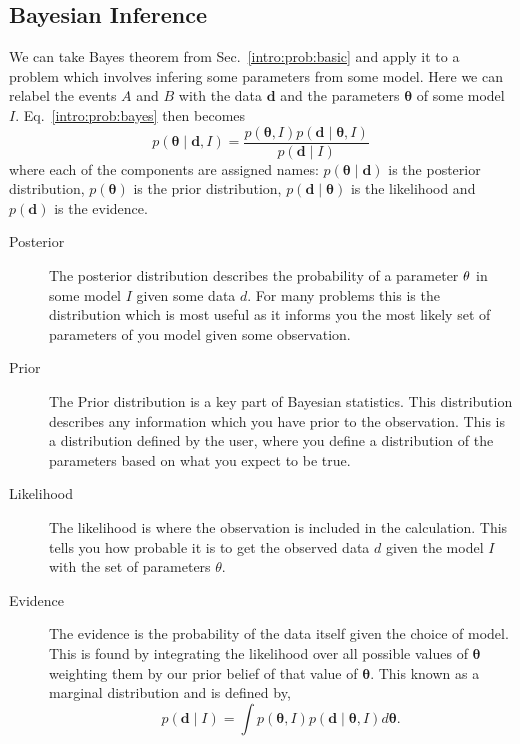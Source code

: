 \subsection{\label{intro:prob:bayes}Bayesian Inference}

We can take Bayes theorem from Sec.~\ref{intro:prob:basic} and apply it to a problem which involves infering some parameters from some model. Here we can relabel the events $A$ and $B$ with the data ${\bm d}$ and the parameters ${\bm \theta}$ of some model $I$.
Eq.~\ref{intro:prob:bayes} then becomes
\begin{equation}
\label{intro:bayes:bayes}
p({\bm \theta} \mid {\bm d}, I) = \frac{p({\bm \theta}, I)p({\bm d} \mid {\bm \theta}, I)}{p({\bm d} \mid I)}
\end{equation}
where each of the components are assigned names: $p({\bm \theta} \mid {\bm d})$ is the posterior distribution, $p({\bm \theta})$ is the prior distribution,  $p({\bm d} \mid {\bm \theta})$ is the likelihood and $p({\bm d})$ is the evidence.

\begin{description}
	\item [Posterior]
	The posterior distribution describes the probability of a parameter ${\bf \theta}$ in some model $I$ given some data $d$. For many problems this is the distribution which is most useful as it informs you the most likely set of parameters of you model given some observation.
	\item [Prior]
	The Prior distribution is a key part of Bayesian statistics. This distribution describes any information which you have prior to the observation. This is a distribution defined by the user, where you define a distribution of the parameters based on what you expect to be true.
	\item [Likelihood]
	The likelihood is where the observation is included in the calculation. This tells you how probable it is to get the observed data $d$ given the model $I$ with the set of parameters $\theta$. 
	\item [Evidence]
	The evidence is the probability of the data itself given the choice of model. This is found by integrating the likelihood over all possible values of ${\bm \theta}$ weighting them by our prior belief of that value of ${\bm \theta}$. This known as a marginal distribution and is defined by,
	\begin{equation}
	\label{intro:bayes:evidence}
	p({\bm d} \mid I) = \int p({\bm \theta}, I)p({\bm d} \mid {\bm \theta}, I) d{\bm \theta}.
	\end{equation}
\end{description}


